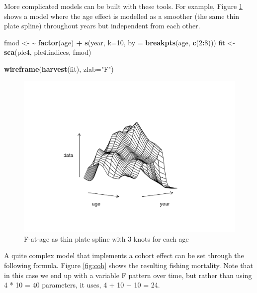 \documentclass[
]{book}
\newenvironment{Shaded}{\begin{snugshade}}{\end{snugshade}}
\newcommand{\AttributeTok}[1]{\textcolor[rgb]{0.13,0.29,0.53}{#1}}
\newcommand{\DecValTok}[1]{\textcolor[rgb]{0.00,0.00,0.81}{#1}}
\newcommand{\ErrorTok}[1]{\textcolor[rgb]{0.64,0.00,0.00}{\textbf{#1}}}
\newcommand{\FunctionTok}[1]{\textcolor[rgb]{0.13,0.29,0.53}{\textbf{#1}}}
\newcommand{\NormalTok}[1]{#1}
\newcommand{\OtherTok}[1]{\textcolor[rgb]{0.56,0.35,0.01}{#1}}
\newcommand{\SpecialCharTok}[1]{\textcolor[rgb]{0.81,0.36,0.00}{\textbf{#1}}}
\newcommand{\StringTok}[1]{\textcolor[rgb]{0.31,0.60,0.02}{#1}}
\begin{document}
More complicated models can be built with these tools. For example, Figure \ref{fig:ageind} shows a model where the age effect is modelled as a smoother (the same thin plate spline) throughout years but independent from each other.

\begin{Shaded}
\begin{Highlighting}[]
\NormalTok{fmod }\OtherTok{\textless{}{-}} \ErrorTok{\textasciitilde{}} \FunctionTok{factor}\NormalTok{(age) }\SpecialCharTok{+} \FunctionTok{s}\NormalTok{(year, }\AttributeTok{k=}\DecValTok{10}\NormalTok{, }\AttributeTok{by =} \FunctionTok{breakpts}\NormalTok{(age, }\FunctionTok{c}\NormalTok{(}\DecValTok{2}\SpecialCharTok{:}\DecValTok{8}\NormalTok{)))}
\NormalTok{fit }\OtherTok{\textless{}{-}} \FunctionTok{sca}\NormalTok{(ple4, ple4.indices, fmod)}
\end{Highlighting}
\end{Shaded}

\begin{Shaded}
\begin{Highlighting}[]
\FunctionTok{wireframe}\NormalTok{(}\FunctionTok{harvest}\NormalTok{(fit), }\AttributeTok{zlab=}\StringTok{"F"}\NormalTok{)}
\end{Highlighting}
\end{Shaded}

\begin{figure}
\centering
\includegraphics{_bookdown_files/_main_files/figure-html/ageind-1.png}
\caption{\label{fig:ageind}F-at-age as thin plate spline with 3 knots for each age}
\end{figure}

A quite complex model that implements a cohort effect can be set through the following formula. Figure \ref{fig:coh} shows the resulting fishing mortality. Note that in this case we end up with a variable F pattern over time, but rather than using 4 * 10 = 40 parameters, it uses, 4 + 10 + 10 = 24.
\end{document}
